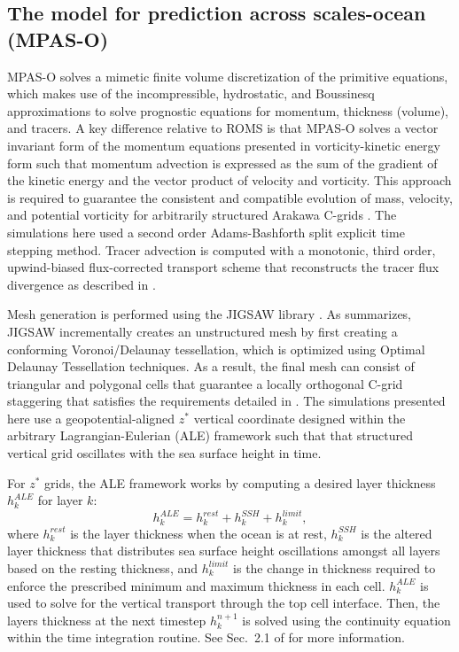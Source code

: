 \subsection{The model for prediction across scales-ocean (MPAS-O)}
MPAS-O solves a mimetic finite volume discretization of the primitive equations, which makes use of the incompressible, hydrostatic, and Boussinesq approximations to solve prognostic equations for momentum, thickness (volume), and tracers. A key difference relative to ROMS is that MPAS-O solves a vector invariant form of the momentum equations presented in vorticity-kinetic energy form such that momentum advection is expressed as the sum of the gradient of the kinetic energy and the vector product of velocity and vorticity. This approach is required to guarantee the consistent and compatible evolution of mass, velocity, and potential vorticity for arbitrarily structured Arakawa C-grids \citep{Arakawa_1977, ringler2010unified}. The simulations here used a second order Adams-Bashforth split explicit time stepping method. Tracer advection is computed with a monotonic, third order, upwind-biased flux-corrected transport scheme that reconstructs the tracer flux divergence as described in \cite{skamarock2011conservative}. 

Mesh generation is performed using the JIGSAW library \citep{engwirda2017jigsaw}. As \cite{hoch2020mpas} summarizes, JIGSAW incrementally creates an unstructured mesh by first creating a conforming Voronoi/Delaunay tessellation, which is optimized using Optimal Delaunay Tessellation techniques. As a result, the final mesh can consist of triangular and polygonal cells that guarantee a locally orthogonal C-grid staggering that satisfies the requirements detailed in \cite{ringler2010unified}. The simulations presented here use a geopotential-aligned $z^*$ vertical coordinate designed within the arbitrary Lagrangian-Eulerian (ALE) framework \citep{petersen2015evaluation, griffies2020primer} such that that structured vertical grid oscillates with the sea surface height in time. 

For $z^*$ grids, the ALE framework works by computing a desired layer thickness $h_k^{ALE}$ for layer $k$:
\begin{equation}
    h_k^{ALE} = h_k^{rest}+h_k^{SSH}+h_k^{limit},
\end{equation}
where $h_k^{rest}$ is the layer thickness when the ocean is at rest, $h_k^{SSH}$ is the altered layer thickness that distributes sea surface height oscillations amongst all layers based on the resting thickness, and $h_k^{limit}$ is the change in thickness required to enforce the prescribed minimum and maximum thickness in each cell.  $h_k^{ALE}$ is used to solve for the vertical transport through the top cell interface. Then, the layers thickness at the next timestep $h_k^{n+1}$ is solved using the continuity equation within the time integration routine. See Sec.~2.1 of \citet{petersen2015evaluation} for more information. 


